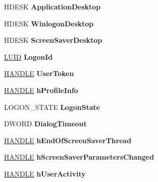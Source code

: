 \begin{DoxyCompactItemize}
H\+D\+E\+SK {\bfseries Application\+Desktop}
\item 
\mbox{\label{struct___w_l_s_e_s_s_i_o_n_a82bce2b53ce969f102272dd60c756243}} 
H\+D\+E\+SK {\bfseries Winlogon\+Desktop}
\item 
\mbox{\label{struct___w_l_s_e_s_s_i_o_n_af6f6495d6562459cba2cb753b3403c7c}} 
H\+D\+E\+SK {\bfseries Screen\+Saver\+Desktop}
\item 
\mbox{\label{struct___w_l_s_e_s_s_i_o_n_a33f7e7d8adb2fe0f035a29f3d2b9f7af}} 
\hyperlink{struct___l_u_i_d}{L\+U\+ID} {\bfseries Logon\+Id}
\item 
\mbox{\label{struct___w_l_s_e_s_s_i_o_n_a746d9fb58d68e1dbd7b759391e2f00f1}} 
\hyperlink{interfacevoid}{H\+A\+N\+D\+LE} {\bfseries User\+Token}
\item 
\mbox{\label{struct___w_l_s_e_s_s_i_o_n_a825475e391d3524aa02d9aa9cc983d38}} 
\hyperlink{interfacevoid}{H\+A\+N\+D\+LE} {\bfseries h\+Profile\+Info}
\item 
\mbox{\label{struct___w_l_s_e_s_s_i_o_n_ae7f211163bb8f465c6ffd4ba7166d89e}} 
L\+O\+G\+O\+N\+\_\+\+S\+T\+A\+TE {\bfseries Logon\+State}
\item 
\mbox{\label{struct___w_l_s_e_s_s_i_o_n_a26caed92b616747e0b7417297e1eb9ac}} 
D\+W\+O\+RD {\bfseries Dialog\+Timeout}
\item 
\mbox{\label{struct___w_l_s_e_s_s_i_o_n_a78240372ffc2a390ec476536c1bd36e7}} 
\hyperlink{interfacevoid}{H\+A\+N\+D\+LE} {\bfseries h\+End\+Of\+Screen\+Saver\+Thread}
\item 
\mbox{\label{struct___w_l_s_e_s_s_i_o_n_a571d43df9349d6d4d8e4e976cfa81363}} 
\hyperlink{interfacevoid}{H\+A\+N\+D\+LE} {\bfseries h\+Screen\+Saver\+Parameters\+Changed}
\item 
\mbox{\label{struct___w_l_s_e_s_s_i_o_n_a03a8d77ad792f98311fc1d883a7cff47}} 
\hyperlink{interfacevoid}{H\+A\+N\+D\+LE} {\bfseries h\+User\+Activity}

\end{DoxyCompactItemize}
